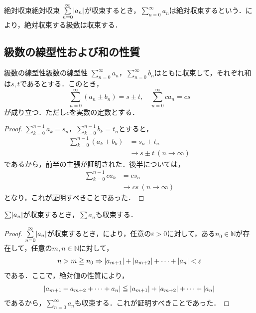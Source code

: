 \begin{definition}{絶対収束}{絶対収束}
  $\sum_{n=0}^{\infty} \abs{a_n}$が収束するとき，$\sum_{n=0}^{\infty} a_n$は絶対収束するという．により，絶対収束する級数は収束する．
\end{definition}

\subsection{級数の線型性および和の性質}

\begin{prop}{級数の線型性}{級数の線型性}
  $\sum_{n=0}^{\infty} a_n$，$\sum_{n=0}^{\infty} b_n$はともに収束して，それぞれ和は$s,t$であるとする．このとき，
  \[
    \sum_{n=0}^{\infty} (a_n \pm b_n) = s \pm t,\quad \sum_{n=0}^{\infty} c a_n =cs
  \]
  が成り立つ．ただし$c$を実数の定数とする．
\end{prop}

\begin{leftbar}
  \begin{proof}
    $\sum_{k=0}^{n-1} a_k = s_n$，$\sum_{k=0}^{n-1} b_k = t_n$とすると，
    \begin{align*}
      \sum_{k=0}^{n-1} (a_k \pm b_k) & = s_n \pm t_n \\
      & \to s \pm t~(n \to \infty)
    \end{align*}
    であるから，前半の主張が証明された．後半については，
    \begin{align*}
      \sum_{k=0}^{n-1} ca_k & = c s_n \\
      & \to cs ~(n \to \infty)
    \end{align*}
    となり，これが証明すべきことであった．
  \end{proof}
\end{leftbar}

\begin{prop}{}{}
  $\sum \abs{a_n}$が収束するとき，$\sum a_n$も収束する．
\end{prop}

\begin{leftbar}
  \begin{proof}
    $\sum_{n=0}^{\infty} \abs{a_n}$が収束するとき，により，任意の$\varepsilon >0$に対して，ある$n_0 \in \mathbb{N}$が存在して，任意の$m,n \in \mathbb{N}$に対して，
    \[
      n > m \geqq n_0 \mathrel{\Rightarrow} \lvert a_{m+1}\rvert +\lvert a_{m+2}\rvert + \cdots + \lvert a_n\rvert<\varepsilon
    \]
    である．ここで，絶対値の性質により，
    \[
      \lvert a_{m+1}+a_{m+2}+\cdots + a_n \rvert \leqq  \lvert a_{m+1}\rvert +\lvert a_{m+2}\rvert + \cdots + \lvert a_n\rvert
    \]
    であるから，$\sum_{n=0}^{\infty} a_n$も収束する．これが証明すべきことであった．
  \end{proof}
\end{leftbar}

